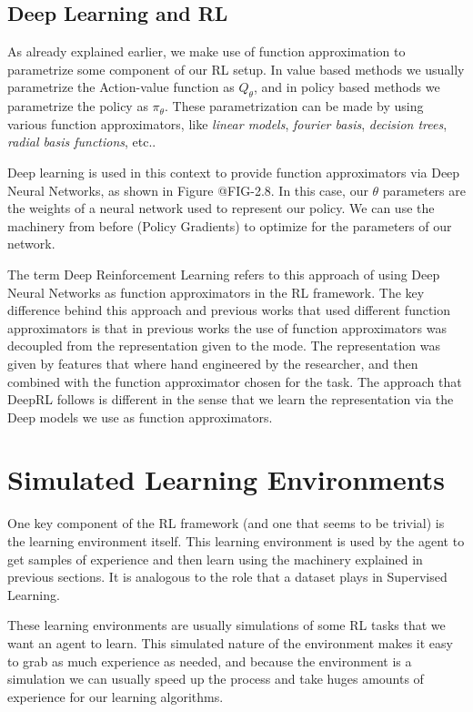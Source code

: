 \figRlPolicyGradientsIntuition

\subsection{Deep Learning and RL}

As already explained earlier, we make use of function approximation to parametrize
some component of our RL setup. In value based methods we usually parametrize the
Action-value function as $Q_{\theta}$, and in policy based methods we parametrize
the policy as $\pi_{\theta}$. These parametrization can be made by using various
function approximators, like \textit{linear models}, \textit{fourier basis}, 
\textit{decision trees}, \textit{radial basis functions}, etc..

Deep learning is used in this context to provide function approximators via Deep
Neural Networks, as shown in Figure @FIG-2.8. In this case, our $\theta$ parameters are the weights of a neural
network used to represent our policy. We can use the machinery from before (Policy Gradients)
to optimize for the parameters of our network.

\figRlPolicyParametrization

The term Deep Reinforcement Learning refers to this approach of using Deep Neural Networks
as function approximators in the RL framework. The key difference behind this approach
and previous works that used different function approximators is that in previous works
the use of function approximators was decoupled from the representation given to the mode.
The representation was given by features that where hand engineered by the researcher, and then
combined with the function approximator chosen for the task. The approach that DeepRL follows is 
different in the sense that we learn the representation via the Deep models we use as function approximators.

\section{Simulated Learning Environments}

One key component of the RL framework (and one that seems to be trivial) is the learning
environment itself. This learning environment is used by the agent to get samples of
experience and then learn using the machinery explained in previous sections. It is analogous
to the role that a dataset plays in Supervised Learning.

These learning environments are usually simulations of some RL tasks that we want an
agent to learn. This simulated nature of the environment makes it easy to grab as much 
experience as needed, and because the environment is a simulation we can usually
speed up the process and take huges amounts of experience for our learning algorithms.


